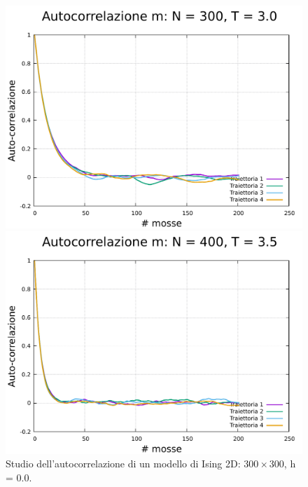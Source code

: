 \begin{figure}[H]
    \begin{minipage}{0.45\textwidth}  
      \centering
      \includegraphics[page=1, width=\textwidth]{Immagini/simIsing2D/metro/tcorr/auto_300_3.0.pdf}
      \caption{$T\,=\,3.0$}
    \end{minipage}\hfill
    \begin{minipage}{0.45\textwidth}  
      \centering
      \includegraphics[page=1, width=\textwidth]{Immagini/simIsing2D/metro/tcorr/auto_300_3.5.pdf}
      \caption{$T\,=\,3.5$}
    \end{minipage}
    \caption{Studio dell'autocorrelazione di un modello di Ising 2D: $300 \times 300$, h = 0.0.}
\end{figure}

